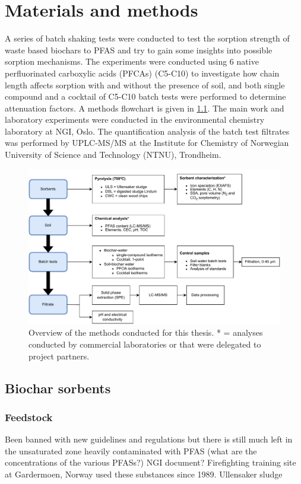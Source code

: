 \chapter{Materials and methods}\label{chap:MatlsMethds}
A series of batch shaking tests were conducted to test the sorption strength of waste based biochars to PFAS and try to gain some insights into possible sorption mechanisms. The experiments were conducted using 6 native perfluorinated carboxylic acids (PFCAs) (C5-C10) to investigate how chain length affects sorption with and without the presence of soil, and both single compound and a cocktail of C5-C10 batch tests were performed to determine attenuation factors. A methods flowchart is given in \cref{fig:methodoverview}. The main work and laboratory experiments were conducted in the environmental chemistry laboratory at NGI, Oslo. The quantification analysis of the batch test filtrates was performed by UPLC-MS/MS at the Institute for Chemistry of Norwegian University of Science and Technology (NTNU), Trondheim. 

\begin{figure}
    \centering
    \includegraphics[width=\textwidth]{Diagrams/Methods-General_overview_methods.pdf}
    \caption{Overview of the methods conducted for this thesis. * = analyses conducted by commercial laboratories or that were delegated to project partners.}
    \label{fig:methodoverview}
\end{figure}

\section{Biochar sorbents}

\subsection{Feedstock}
Been banned with new guidelines and regulations but there is still much left in the unsaturated zone heavily contaminated with PFAS (what are the concentrations of the various PFASs?) NGI document? Firefighting training site at Gardermoen, Norway used these substances since 1989. Ullensaker sludge

